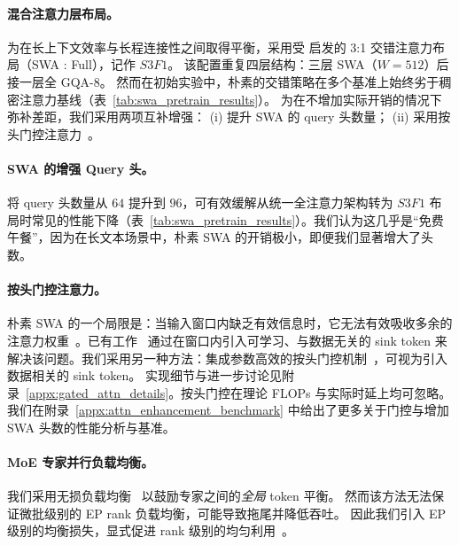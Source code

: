 \paragraph{混合注意力层布局。}\label{sec:hybrid_swa}
为在长上下文效率与长程连接性之间取得平衡，\ourmodel 采用受 \cite{openai2025gptoss120bgptoss20bmodel,gemmateam2025gemma3technicalreport,cohere2025commandaenterprisereadylarge} 启发的 3:1 交错注意力布局（SWA : Full），记作 $S3F1$。
该配置重复四层结构：三层 SWA（$W{=}512$）后接一层全 GQA-8。
然而在初始实验中，朴素的交错策略在多个基准上始终劣于稠密注意力基线（表~\ref{tab:swa_pretrain_results}）。
为在不增加实际开销的情况下弥补差距，我们采用两项互补增强：
(i) 提升 SWA 的 query 头数量；
(ii) 采用按头门控注意力~\cite{qiu2025gatedattentionlargelanguage}。

\paragraph{SWA 的增强 Query 头。}

将 query 头数量从 $64$ 提升到 $96$，可有效缓解从统一全注意力架构转为 $S3F1$ 布局时常见的性能下降（表~\ref{tab:swa_pretrain_results}）。我们认为这几乎是“免费午餐”，因为在长文本场景中，朴素 SWA 的开销极小，即便我们显著增大了头数。

\paragraph{按头门控注意力。}
朴素 SWA 的一个局限是：当输入窗口内缺乏有效信息时，它无法有效吸收多余的注意力权重~\cite{xiao2024efficient,sun2024massive,gu2025when, qiu2025gatedattentionlargelanguage}。已有工作~\cite{openai2025gptoss120bgptoss20bmodel,xiao2026mimov2flashtechnicalreport} 通过在窗口内引入可学习、与数据无关的 sink token 来解决该问题。我们采用另一种方法：集成参数高效的按头门控机制~\cite{jumper_highly_2021,qiu2025gatedattentionlargelanguage,lin2025forgetting}，可视为引入数据相关的 sink token。
实现细节与进一步讨论见附录~\ref{appx:gated_attn_details}。按头门控在理论 FLOPs 与实际时延上均可忽略。我们在附录~\ref{appx:attn_enhancement_benchmark} 中给出了更多关于门控与增加 SWA 头数的性能分析与基准。


\paragraph{MoE 专家并行负载均衡。}\label{sec:moe_design}

我们采用无损负载均衡~\cite{deepseek2024deepseekv3,wang2024lossfreebalancing} 以鼓励专家之间的\emph{全局} token 平衡。
然而该方法无法保证微批级别的 EP rank 负载均衡，可能导致拖尾并降低吞吐。
因此我们引入 EP 级别的均衡损失，显式促进 rank 级别的均匀利用~\cite{dai2024deepseekmoeultimateexpertspecialization}。

